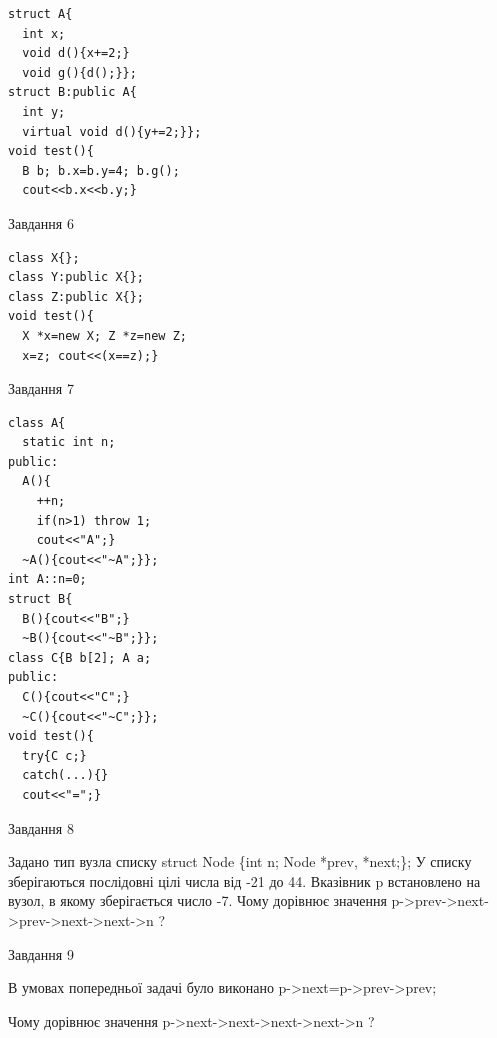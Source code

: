 \documentclass[12pt, ukrainian]{article}
\begin{document}
{{{{{{{{{{{\begin{minipage}[t]{7cm}
\begin{verbatim}
struct A{
  int x;
  void d(){x+=2;}
  void g(){d();}};
struct B:public A{
  int y;
  virtual void d(){y+=2;}};
void test(){
  B b; b.x=b.y=4; b.g();
  cout<<b.x<<b.y;}
\end{verbatim}            


               
{\begin{center}Завдання {6}\end{center}}
\vspace{-6mm}

\begin{verbatim}
class X{};
class Y:public X{};
class Z:public X{};
void test(){
  X *x=new X; Z *z=new Z;
  x=z; cout<<(x==z);}
\end{verbatim}            


               
{\begin{center}Завдання {7}\end{center}}
\vspace{-6mm}

\begin{verbatim}
class A{
  static int n;
public:
  A(){
    ++n; 
    if(n>1) throw 1;
    cout<<"A";}
  ~A(){cout<<"~A";}};
int A::n=0;
struct B{
  B(){cout<<"B";}
  ~B(){cout<<"~B";}};
class C{B b[2]; A a;
public:
  C(){cout<<"C";}
  ~C(){cout<<"~C";}};
void test(){
  try{C c;} 
  catch(...){} 
  cout<<"=";}
\end{verbatim}            


\end{minipage}
               
{\begin{center}Завдання {8}\end{center}}
\vspace{-6mm}
Задано тип вузла списку
struct Node \{int n; Node *prev, *next;\};
У списку зберігаються послідовні цілі числа від -21 до 44. Вказівник p встановлено на вузол, в якому зберігається число -7.
Чому дорівнює значення p->prev->next->prev->next->next->n ?\par

               
{\begin{center}Завдання {9}\end{center}}
\vspace{-6mm}
В умовах попередньої задачі було виконано p->next=p->prev->prev;

Чому дорівнює значення p->next->next->next->next->n ?\par

}}}}}}}}}}}
\end{document}
